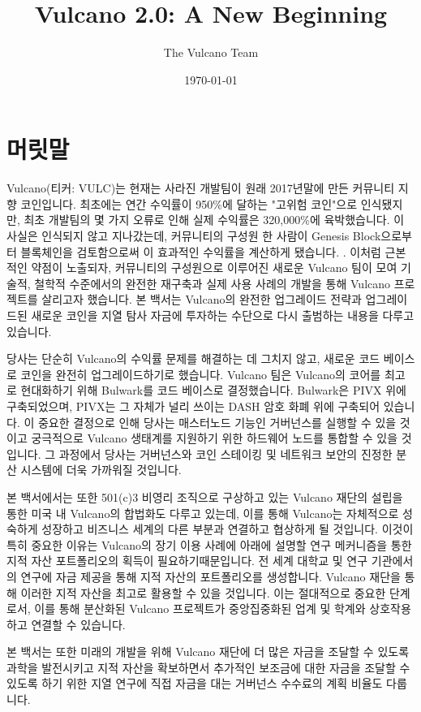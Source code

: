 \documentclass[A4paper, 12pt]{article}
\begin{document}
\title{Vulcano 2.0: A New Beginning}
\author{The Vulcano Team}
\date{\today}

\newpage
\tableofcontents
\newpage
\section{머릿말}

Vulcano(티커: VULC)는 현재는 사라진 개발팀이 원래 2017년말에 만든 커뮤니티 지향 코인입니다. 최초에는 연간 수익률이 950\%에 달하는 "고위험 코인"으로 인식됐지만, 최초 개발팀의 몇 가지 오류로 인해 실제 수익률은 320,000\%에 육박했습니다. 이 사실은 인식되지 않고 지나갔는데, 커뮤니티의 구성원 한 사람이 Genesis Block으로부터 블록체인을 검토함으로써 이 효과적인 수익률을 계산하게 됐습니다. . 이처럼 근본적인 약점이 노출되자, 커뮤니티의 구성원으로 이루어진 새로운 Vulcano 팀이 모여 기술적, 철학적 수준에서의 완전한 재구축과 실제 사용 사례의 개발을 통해 Vulcano 프로젝트를 살리고자 했습니다. 본 백서는 Vulcano의 완전한 업그레이드 전략과 업그레이드된 새로운 코인을 지열 탐사 자금에 투자하는 수단으로 다시 출범하는 내용을 다루고 있습니다.

당사는 단순히 Vulcano의 수익률 문제를 해결하는 데 그치지 않고, 새로운 코드 베이스로 코인을 완전히 업그레이드하기로 했습니다. Vulcano 팀은 Vulcano의 코어를 최고로 현대화하기 위해 Bulwark를 코드 베이스로 결정했습니다. Bulwark은 PIVX 위에 구축되었으며, PIVX는 그 자체가 널리 쓰이는 DASH 암호 화폐 위에 구축되어 있습니다. 이 중요한 결정으로 인해 당사는 매스터노드 기능인 거버넌스를 실행할 수 있을 것이고 궁극적으로 Vulcano 생태계를 지원하기 위한 하드웨어 노드를 통합할 수 있을 것입니다. 그 과정에서 당사는 거버넌스와 코인 스테이킹 및 네트워크 보안의 진정한 분산 시스템에 더욱 가까워질 것입니다.

본 백서에서는 또한 501(c)3 비영리 조직으로 구상하고 있는 Vulcano 재단의 설립을 통한 미국 내 Vulcano의 합법화도 다루고 있는데, 이를 통해 Vulcano는 자체적으로 성숙하게 성장하고 비즈니스 세계의 다른 부분과 연결하고 협상하게 될 것입니다. 이것이 특히 중요한 이유는 Vulcano의 장기 이용 사례에 아래에 설명할 연구 메커니즘을 통한 지적 자산 포트폴리오의 획득이 필요하기때문입니다. 전 세계 대학교 및 연구 기관에서의 연구에 자금 제공을 통해 지적 자산의 포트폴리오를 생성합니다. Vulcano 재단을 통해 이러한 지적 자산을 최고로 활용할 수 있을 것입니다. 이는 절대적으로 중요한 단계로서, 이를 통해 분산화된 Vulcano 프로젝트가 중앙집중화된 업계 및 학계와 상호작용하고 연결할 수 있습니다.

본 백서는 또한 미래의 개발을 위해 Vulcano 재단에 더 많은 자금을 조달할 수 있도록 과학을 발전시키고 지적 자산을 확보하면서 추가적인 보조금에 대한 자금을 조달할 수 있도록 하기 위한 지열 연구에 직접 자금을 대는 거버넌스 수수료의 계획 비율도 다룹니다.
\end{document}
